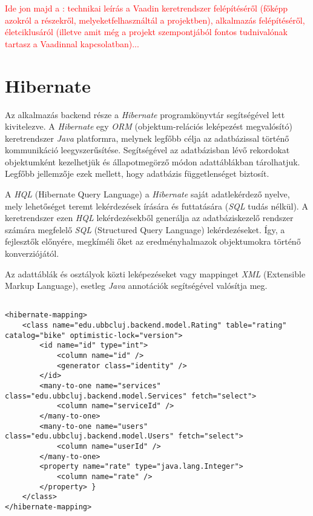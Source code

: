 \par 
\textcolor{red}{Ide jon majd a : technikai leírás a Vaadin keretrendszer felépítéséről (főképp azokról a részekről, melyeketfelhasználtál a projektben), alkalmazás felépítéséről, életciklusáról (illetve amit még a projekt szempontjából fontos tudnivalónak tartasz a Vaadinnal kapcsolatban)... }

%
\section{Hibernate}\label{sec:FELH:hi}

\par Az alkalmazás backend része a \textit{Hibernate} programkönyvtár segítségével lett kivitelezve. A \textit{Hibernate} egy \textit{ORM} (objektum-relációs leképezést megvalósító) keretrendszer \textit{Java} platformra, melynek legfőbb célja az adatbázissal történő kommunikáció leegyszerűsítése. Segítségével az adatbázisban lévő rekordokat objektumként kezelhetjük és állapotmegörző módon adattáblákban tárolhatjuk. Legfőbb jellemzője ezek mellett, hogy adatbázis függetlenséget biztosít.
\par A \textit{HQL} (Hibernate Query Language) a \textit{Hibernate} saját adatlekérdező nyelve, mely lehetőséget teremt lekérdezések írására és futtatására (\textit{SQL} tudás nélkül). A keretrendszer ezen \textit{HQL} lekérdezésekből generálja az adatbáziskezelő rendszer számára megfelelő \textit{SQL} (Structured Query Language) lekérdezéseket. Így, a fejlesztők előnyére, megkíméli őket az eredményhalmazok objektumokra történő konverziójától.
\par Az adattáblák és osztályok közti leképezéseket vagy mappinget \textit{XML} (Extensible Markup Language), esetleg \textit{Java} annotációk segítségével valósítja meg. 

\lstset{language=XML}
\begin{lstlisting}

<hibernate-mapping>
    <class name="edu.ubbcluj.backend.model.Rating" table="rating" catalog="bike" optimistic-lock="version">
        <id name="id" type="int">
            <column name="id" />
            <generator class="identity" />
        </id>
        <many-to-one name="services" class="edu.ubbcluj.backend.model.Services" fetch="select">
            <column name="serviceId" />
        </many-to-one>
        <many-to-one name="users" class="edu.ubbcluj.backend.model.Users" fetch="select">
            <column name="userId" />
        </many-to-one>
        <property name="rate" type="java.lang.Integer">
            <column name="rate" />
        </property> }
    </class>
</hibernate-mapping>
\end{lstlisting}

